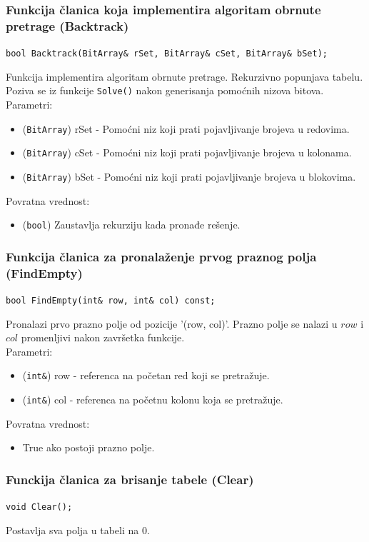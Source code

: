\documentclass[a4paper]{article}
\begin{document}
    \subsubsection{Funkcija članica koja implementira algoritam obrnute pretrage (Backtrack)}
    {\parindent0pt
    \texttt{bool Backtrack(BitArray\& rSet, BitArray\& cSet, BitArray\& bSet);}
    }
    \par Funkcija implementira algoritam obrnute pretrage. Rekurzivno popunjava tabelu. Poziva se iz funkcije \texttt{Solve()} nakon generisanja pomoćnih nizova bitova.
    Parametri:
    \begin{itemize}
        \item (\texttt{BitArray}) rSet - Pomoćni niz koji prati pojavljivanje brojeva u redovima.
        \item (\texttt{BitArray}) cSet - Pomoćni niz koji prati pojavljivanje brojeva u kolonama.
        \item (\texttt{BitArray}) bSet - Pomoćni niz koji prati pojavljivanje brojeva u blokovima.
    \end{itemize}
    Povratna vrednost:
    \begin{itemize}
        \item (\texttt{bool}) Zaustavlja rekurziju kada pronađe rešenje.
    \end{itemize}

    \subsubsection{Funkcija članica za pronalaženje prvog praznog polja (FindEmpty)}
	\texttt{bool FindEmpty(int\& row, int\& col) const;}
    \par Pronalazi prvo prazno polje od pozicije '(row, col)'. Prazno polje se nalazi u $row$ i $col$ promenljivi nakon završetka funkcije.\\
    Parametri:
    \begin{itemize}
        \item (\texttt{int\&}) row - referenca na početan red koji se pretražuje.
        \item (\texttt{int\&}) col - referenca na početnu kolonu koja se pretražuje.
    \end{itemize}
    Povratna vrednost:
    \begin{itemize}
        \item True ako postoji prazno polje.
    \end{itemize}

    \subsubsection{Funckija članica za brisanje tabele (Clear)}
    \texttt{void Clear();}
    \par Postavlja sva polja u tabeli na 0.
\end{document}
